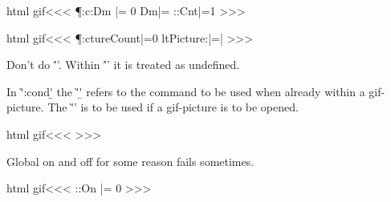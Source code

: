 {{{{\<html gif\><<<
\def\NewPictureDomain#1{%
   \global\let\Pic:Cnt|=\P:ctureCount
   \def\Pic:Dm{#1} \ifx \Pic:Dm\empty
      \xdef\Pic:Dm{\P:c:Dm}%
      \gHAdvance\P:c:Dm   |by 1
   \fi }
\HAssign\P:c:Dm |= 0
\let\Pic:Dm|=\empty   
\HAssign\Pic:Cnt|=1
>>>



\<html gif\><<<
\HAssign\P:ctureCount|=0 
\let\:AltPicture:|=\empty        |%
>>>




Don't do \''\let\EndPicture=\relax'. Within \''\PictureOff' it is treated as
undefined.





In \`'\pic:cond\a\b' the \`'\b' refers to the command to be used when
already within a gif-picture. The \`'\a' is to be used if a
gif-picture is to be opened.


\<html gif\><<<
\def\pic:gobble{\ifx \EndPicture\:UnDef \else \expandafter\:gobble\fi}
\def\pic:gobbleII{\ifx \EndPicture\:UnDef \else \expandafter\:gobbleII\fi}
\def\nopic:gobble#1{\ifx \EndPicture\:UnDef \else #1\fi}
\def\pic:cond#1#2{%
   \ifx\EndPicture\:UnDef \def\end:condpic{\EndPicture}\expandafter#1%
   \else                  \let\end:condpic|=\empty  \expandafter#2%
   \fi }
\def\cond:pic#1{%
   \ifx \EndPicture\:UnDef #1\else     
      \let\E:pic|=\EndPicture \PushMacro\E:pic
      \def\EndPicture{\PopMacro\E:pic \let\EndPicture|=\E:pic}\fi}
>>>




Global on and off for some reason fails sometimes.


\<html gif\><<<
\def\PictureOff{%
   \expandafter\let\csname Pic:\Pic:On\endcsname|=\EndPicture
   \ifx \EndPicture\:UnDef   \let\EndPicture|=\empty \fi
   |<picture off|>%
   \Advance:\Pic:On |by 1 }
\def\PictureOn{%
   \ifnum \Pic:On>0
     \Advance:\Pic:On |by -1
     \ifnum \Pic:On=0  |<picture on|>%
     \fi
     \expand:after{\let\EndPicture|=}\csname Pic:\Pic:On\endcsname
     \ifx \EndPicture\relax \let\EndPicture|=\:UnDef\fi 
   \else
     \:warning{\string\PictureOn\space without \string\PictureOff}%
   \fi }
\HAssign\Pic:On |= 0
>>>















}}}}
